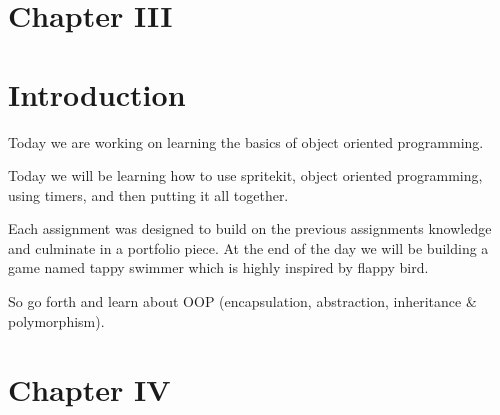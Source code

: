 \documentclass[12pt]{report}
\begin{document}
\vspace{\baselineskip}

\vspace{\baselineskip}



\newpage

\vspace{\baselineskip}
\vspace{\baselineskip}
\section*{Chapter III}
\section*{Introduction}

\vspace{\baselineskip}
Today we are working on learning the basics of object oriented programming. \par


\vspace{\baselineskip}
Today we will be learning how to use spritekit, object oriented programming, using timers, and then putting it all together. \par


\vspace{\baselineskip}
Each assignment was designed to build on the previous assignments knowledge and culminate in a portfolio piece. At the end of the day we will be building a game named tappy swimmer which is highly inspired by flappy bird. \par


\vspace{\baselineskip}
So go forth and learn about OOP (encapsulation, abstraction, inheritance $\&$  polymorphism). \par


\vspace{\baselineskip}

\vspace{\baselineskip}



\newpage

\vspace{\baselineskip}\section*{Chapter IV}
\end{document}
